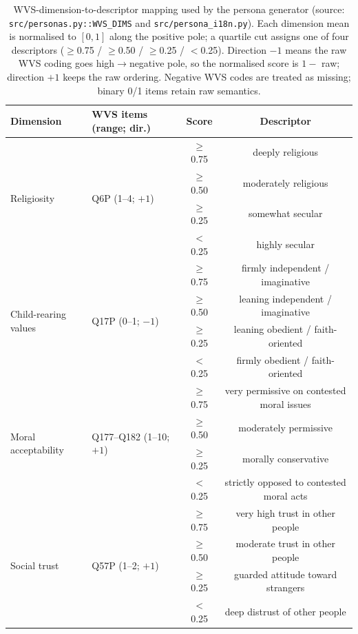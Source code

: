 \documentclass{article}
\begin{document}
\begin{table}[h]\centering\small
\caption{WVS-dimension-to-descriptor mapping used by the persona generator
(source: \texttt{src/personas.py::WVS\_DIMS} and \texttt{src/persona\_i18n.py}).
Each dimension mean is normalised to $[0,1]$ along the positive pole;
a quartile cut assigns one of four descriptors ($\geq$0.75 / $\geq$0.50 /
$\geq$0.25 / $<$0.25). Direction $-1$ means the raw WVS coding goes
high${\to}$negative pole, so the normalised score is $1 -$ raw;
direction $+1$ keeps the raw ordering. Negative WVS codes are treated as
missing; binary 0/1 items retain raw semantics.}
\label{tab:wvs_thresholds}
\setlength{\tabcolsep}{3pt}
\begin{tabular}{p{2.8cm}p{3.6cm}cc}\toprule
Dimension & WVS items (range; dir.) & Score & Descriptor \\\midrule
\multirow{4}{2.8cm}{Religiosity}
 & \multirow{4}{3.6cm}{Q6P (1--4; $+1$)}
 & $\geq$0.75 & deeply religious \\
 & & $\geq$0.50 & moderately religious \\
 & & $\geq$0.25 & somewhat secular \\
 & & $<$0.25    & highly secular \\\midrule
\multirow{4}{2.8cm}{Child-rearing values}
 & \multirow{4}{3.6cm}{Q17P (0--1; $-1$)}
 & $\geq$0.75 & firmly independent / imaginative \\
 & & $\geq$0.50 & leaning independent / imaginative \\
 & & $\geq$0.25 & leaning obedient / faith-oriented \\
 & & $<$0.25    & firmly obedient / faith-oriented \\\midrule
\multirow{4}{2.8cm}{Moral acceptability}
 & \multirow{4}{3.6cm}{Q177--Q182 (1--10; $+1$)}
 & $\geq$0.75 & very permissive on contested moral issues \\
 & & $\geq$0.50 & moderately permissive \\
 & & $\geq$0.25 & morally conservative \\
 & & $<$0.25    & strictly opposed to contested moral acts \\\midrule
\multirow{4}{2.8cm}{Social trust}
 & \multirow{4}{3.6cm}{Q57P (1--2; $+1$)}
 & $\geq$0.75 & very high trust in other people \\
 & & $\geq$0.50 & moderate trust in other people \\
 & & $\geq$0.25 & guarded attitude toward strangers \\
 & & $<$0.25    & deep distrust of other people \\\midrule

\end{tabular}
\end{table}
\end{document}
